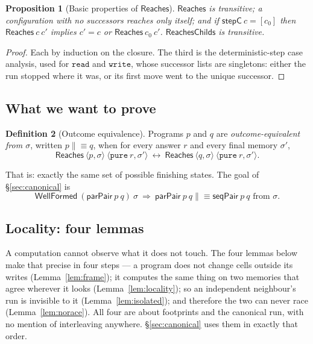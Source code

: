 \documentclass[11pt,a4paper]{article}
\theoremstyle{definition}
\newtheorem{definition}{Definition}
\theoremstyle{plain}
\newtheorem{proposition}[definition]{Proposition}
\theoremstyle{remark}
\newcommand{\st}{\sigma}
\newcommand{\wf}{\mathsf{WellFormed}}
\newcommand{\Reaches}{\mathsf{Reaches}}
\begin{document}
\begin{proposition}[Basic properties of $\Reaches$]\label{prop:reachesbasic}
$\Reaches$ is transitive; a configuration with no successors reaches only itself; and if
$\mathsf{stepC}\ c = [c_0]$ then $\Reaches\ c\ c'$ implies $c' = c$ or
$\Reaches\ c_0\ c'$. $\mathsf{ReachesChilds}$ is transitive.
\end{proposition}

\begin{proof}
Each by induction on the closure. The third is the deterministic-step case analysis, used
for $\texttt{read}$ and $\texttt{write}$, whose successor lists are singletons: either the
run stopped where it was, or its first move went to the unique successor.
\end{proof}

\subsection{What we want to prove}\label{sec:indep:goal}

\begin{definition}[Outcome equivalence]\label{def:parseqeq}
Programs $p$ and $q$ are \emph{outcome-equivalent from $\st$}, written
$p \mathrel{\|\!\equiv} q$, when for every answer $r$ and every final memory $\st'$,
\[
  \Reaches\ \langle p, \st\rangle\ \langle \texttt{pure}\ r, \st'\rangle
  \ \longleftrightarrow\
  \Reaches\ \langle q, \st\rangle\ \langle \texttt{pure}\ r, \st'\rangle .
\]
\end{definition}

That is: exactly the same set of possible finishing states. The goal of
\S\ref{sec:canonical} is
\[
  \wf\ (\mathsf{parPair}\ p\ q)\ \st
  \ \Longrightarrow\
  \mathsf{parPair}\ p\ q \mathrel{\|\!\equiv} \mathsf{seqPair}\ p\ q \text{ from } \st .
\]

\subsection{Locality: four lemmas}\label{sec:indep:locality}

A computation cannot observe what it does not touch. The four lemmas below make that precise
in four steps --- a program does not change cells outside its writes
(Lemma~\ref{lem:frame}); it computes the same thing on two memories that agree wherever it
looks (Lemma~\ref{lem:locality}); so an independent neighbour's run is invisible to it
(Lemma~\ref{lem:isolated}); and therefore the two can never race
(Lemma~\ref{lem:norace}). All four are about footprints and the canonical run, with no
mention of interleaving anywhere. \S\ref{sec:canonical} uses them in exactly that order.
\end{document}
